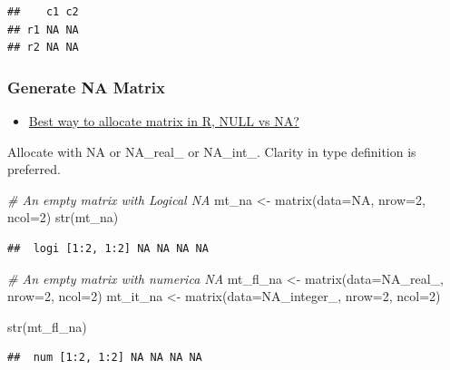 \documentclass[
]{book}
\newenvironment{Shaded}{\begin{snugshade}}{\end{snugshade}}
\newcommand{\AttributeTok}[1]{\textcolor[rgb]{0.77,0.63,0.00}{#1}}
\newcommand{\CommentTok}[1]{\textcolor[rgb]{0.56,0.35,0.01}{\textit{#1}}}
\newcommand{\ConstantTok}[1]{\textcolor[rgb]{0.00,0.00,0.00}{#1}}
\newcommand{\DecValTok}[1]{\textcolor[rgb]{0.00,0.00,0.81}{#1}}
\newcommand{\FunctionTok}[1]{\textcolor[rgb]{0.00,0.00,0.00}{#1}}
\newcommand{\NormalTok}[1]{#1}
\newcommand{\OtherTok}[1]{\textcolor[rgb]{0.56,0.35,0.01}{#1}}
\providecommand{\tightlist}{%
  \setlength{\itemsep}{0pt}\setlength{\parskip}{0pt}}
\begin{document}
\begin{verbatim}
##    c1 c2
## r1 NA NA
## r2 NA NA
\end{verbatim}

\hypertarget{generate-na-matrix}{%
\subsubsection{Generate NA Matrix}\label{generate-na-matrix}}

\begin{itemize}
\tightlist
\item
  \href{https://stackoverflow.com/a/26724451/8280804}{Best way to allocate matrix in R, NULL vs NA?}
\end{itemize}

Allocate with NA or NA\_real\_ or NA\_int\_. Clarity in type definition is preferred.

\begin{Shaded}
\begin{Highlighting}[]
\CommentTok{\# An empty matrix with Logical NA}
\NormalTok{mt\_na }\OtherTok{\textless{}{-}} \FunctionTok{matrix}\NormalTok{(}\AttributeTok{data=}\ConstantTok{NA}\NormalTok{, }\AttributeTok{nrow=}\DecValTok{2}\NormalTok{, }\AttributeTok{ncol=}\DecValTok{2}\NormalTok{)}
\FunctionTok{str}\NormalTok{(mt\_na)}
\end{Highlighting}
\end{Shaded}

\begin{verbatim}
##  logi [1:2, 1:2] NA NA NA NA
\end{verbatim}

\begin{Shaded}
\begin{Highlighting}[]
\CommentTok{\# An empty matrix with numerica NA}
\NormalTok{mt\_fl\_na }\OtherTok{\textless{}{-}} \FunctionTok{matrix}\NormalTok{(}\AttributeTok{data=}\ConstantTok{NA\_real\_}\NormalTok{, }\AttributeTok{nrow=}\DecValTok{2}\NormalTok{, }\AttributeTok{ncol=}\DecValTok{2}\NormalTok{)}
\NormalTok{mt\_it\_na }\OtherTok{\textless{}{-}} \FunctionTok{matrix}\NormalTok{(}\AttributeTok{data=}\ConstantTok{NA\_integer\_}\NormalTok{, }\AttributeTok{nrow=}\DecValTok{2}\NormalTok{, }\AttributeTok{ncol=}\DecValTok{2}\NormalTok{)}

\FunctionTok{str}\NormalTok{(mt\_fl\_na)}
\end{Highlighting}
\end{Shaded}

\begin{verbatim}
##  num [1:2, 1:2] NA NA NA NA
\end{verbatim}
\end{document}
